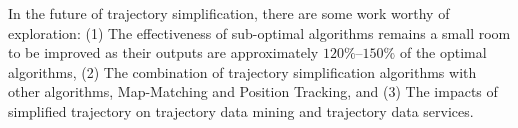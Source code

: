 In the future of trajectory simplification, there are some work worthy of exploration:
%
(1) The effectiveness of sub-optimal algorithms remains a small room to be improved as their outputs are approximately $120\%$--$150\%$ of the optimal algorithms,
%
(2) The combination of trajectory simplification algorithms with other algorithms, \eg Map-Matching and Position Tracking, and
(3) The impacts of simplified trajectory on trajectory data mining and trajectory data services.

